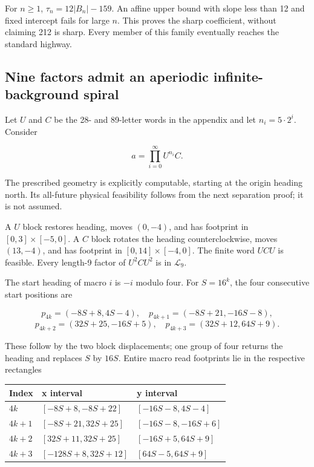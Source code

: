 \documentclass[
  11pt,
]{article}
\begin{document}
For \(n\ge1\), \(\tau_n=12|B_n|-159\). An affine upper bound with slope
less than 12 and fixed intercept fails for large \(n\). This proves the
sharp coefficient, without claiming 212 is sharp. Every member of this
family eventually reaches the standard highway.

\subsection{Nine factors admit an aperiodic infinite-background
spiral}\label{ten-7}

Let \(U\) and \(C\) be the 28- and 89-letter words in the appendix and
let \(n_i=5\cdot2^i\). Consider

\[a=\prod_{i=0}^{\infty} U^{n_i}C.\]

The prescribed geometry is explicitly computable, starting at the origin
heading north. Its all-future physical feasibility follows from the next
separation proof; it is not assumed.

A \(U\) block restores heading, moves \((0,-4)\), and has footprint in
\([0,3]\times[-5,0]\). A \(C\) block rotates the heading
counterclockwise, moves \((13,-4)\), and has footprint in
\([0,14]\times[-4,0]\). The finite word \(UCU\) is feasible. Every
length-9 factor of \(U^2CU^2\) is in \(\mathcal L_9\).

The start heading of macro \(i\) is \(-i\) modulo four. For \(S=16^k\),
the four consecutive start positions are

\[p_{4k}=(-8S+8,4S-4),\quad p_{4k+1}=(-8S+21,-16S-8),\]
\[p_{4k+2}=(32S+25,-16S+5),\quad p_{4k+3}=(32S+12,64S+9).\]

These follow by the two block displacements; one group of four returns
the heading and replaces \(S\) by \(16S\). Entire macro read footprints
lie in the respective rectangles

\begin{longtable}[]{@{}lll@{}}
\toprule\noalign{}
Index & x interval & y interval \\
\midrule\noalign{}
\endhead
\bottomrule\noalign{}
\endlastfoot
\(4k\) & \([-8S+8,-8S+22]\) & \([-16S-8,4S-4]\) \\
\(4k+1\) & \([-8S+21,32S+25]\) & \([-16S-8,-16S+6]\) \\
\(4k+2\) & \([32S+11,32S+25]\) & \([-16S+5,64S+9]\) \\
\(4k+3\) & \([-128S+8,32S+12]\) & \([64S-5,64S+9]\) \\
\end{longtable}
\end{document}
